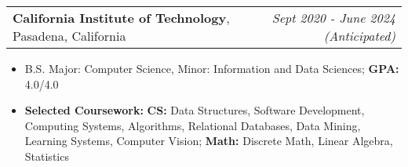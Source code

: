\documentclass[letterpaper,11pt]{article}
\makeatletter
\newcommand{\resitem}[1]{\item[--] #1 \vspace{-8pt}}
\newcommand{\edusubheading}[3]{
	\vspace{6pt}
	\begin{tabular*}{7.5in}{l@{\extracolsep{\fill}}r}
		\textbf{#1}, #2 & \textit{#3} \\
	\end{tabular*}
	\vspace{-20pt}
	}
\newcommand{\myitem}[1]{\item[--] #1 \vspace{-8pt}}
\newcommand{\mysubitem}[1]{\item #1 \vspace{-4pt}}
\makeatother
\begin{document}

\edusubheading{California Institute of Technology}{Pasadena, California}{Sept 2020 - June 2024 (Anticipated)}
	\begin{itemize}[leftmargin=*]
		\resitem{B.S. Major: Computer Science, Minor: Information and Data Sciences; \textbf{GPA:} 4.0/4.0}
		\resitem{\textbf{Selected Coursework:} \textbf{CS:} Data Structures, Software Development, Computing Systems, Algorithms, Relational Databases, Data Mining, Learning Systems, Computer Vision; \textbf{Math:} Discrete Math, Linear Algebra, Statistics}
	\end{itemize}

\end{document}
